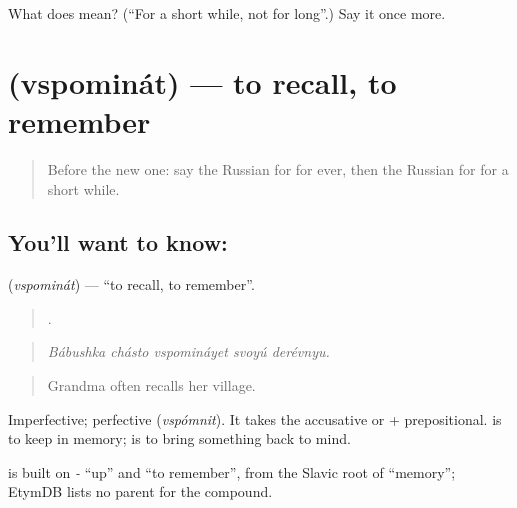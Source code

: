 \begin{tcolorbox}[breakable,colback=teal!4,colframe=teal!35!black,title={Before you move on}]
What does  mean? (\textquotedblleft{}For a short while, not for long\textquotedblright{}.) Say it once more.
\end{tcolorbox}
\section[\texorpdfstring{\ru{вспоминать} (vspominát)}{вспоминать (vspominát)}]{ (vspominát) — to recall, to remember}

\label{lesson:RU-C278-vspominat}



\begin{quote}
Before the new one: say the Russian for for ever, then the Russian for for a short while.
\end{quote}

\subsection*{You'll want to know: }
\textbf{} (\emph{vspominát}) — \textquotedblleft{}to recall, to remember\textquotedblright{}.

\begin{quote}
    .
\end{quote}

\begin{quote}
\emph{Bábushka chásto vspomináyet svoyú derévnyu.}
\end{quote}

\begin{quote}
Grandma often recalls her village.
\end{quote}

Imperfective; perfective \emph{} (\emph{vspómnit}). It takes the accusative or \emph{} + prepositional. \emph{} is to keep in memory; \emph{} is to bring something back to mind.

\begin{cousinweb}
\emph{} is built on \emph{-} \textquotedblleft{}up\textquotedblright{} and \emph{} \textquotedblleft{}to remember\textquotedblright{}, from the Slavic root of \emph{} \textquotedblleft{}memory\textquotedblright{}; EtymDB lists no parent for the compound.
\end{cousinweb}

